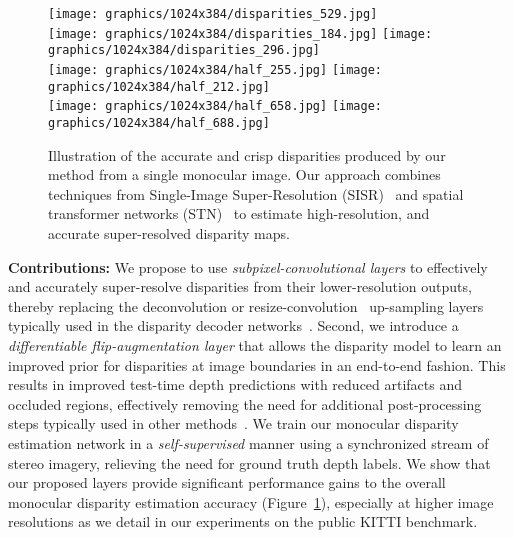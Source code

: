 \documentclass[letterpaper, 10 pt, conference]{ieeeconf}  \IEEEoverridecommandlockouts
\begin{document}
 \begin{figure}[!t]
 \centering
  \texttt{[image: graphics/1024x384/disparities\_529.jpg]} 
 \\
  \texttt{[image: graphics/1024x384/disparities\_184.jpg]} 
  \texttt{[image: graphics/1024x384/disparities\_296.jpg]}   
  \\
  \texttt{[image: graphics/1024x384/half\_255.jpg]}
  \texttt{[image: graphics/1024x384/half\_212.jpg]}
  \\  
  \texttt{[image: graphics/1024x384/half\_658.jpg]}
  \texttt{[image: graphics/1024x384/half\_688.jpg]}
  \\  
  \caption{Illustration of the accurate and crisp disparities produced by our method from a single monocular image. Our approach combines techniques from Single-Image Super-Resolution (SISR)~\cite{shi2016real} and spatial transformer networks (STN)~\cite{jaderberg2015spatial} to estimate high-resolution, and accurate super-resolved disparity maps.}
\label{fig:intro-fig}
  \end{figure}
 

\textbf{Contributions:}
We propose to use \textit{subpixel-convolutional layers} to effectively and accurately super-resolve disparities from their lower-resolution outputs, thereby replacing the deconvolution or resize-convolution~\cite{odena2016deconvolution} up-sampling layers typically used in the disparity decoder networks~\cite{monodepth17,zhou2017unsupervised}.
Second, we introduce a \textit{differentiable flip-augmentation layer} that allows the disparity model to learn an improved prior for disparities at image boundaries in an end-to-end fashion. This results in improved test-time depth predictions with reduced artifacts and occluded regions, effectively removing the need for additional post-processing steps typically used in other methods~\cite{godard2017unsupervised,yin2018geonet}. 
We train our monocular disparity estimation network in a \textit{self-supervised} manner using a synchronized stream of stereo imagery, relieving the need for ground truth depth labels. 
We show that our proposed layers provide significant performance gains to the overall monocular disparity estimation accuracy (Figure~\ref{fig:intro-fig}), especially at higher image resolutions as we detail in our experiments on the public KITTI benchmark.
\end{document}
